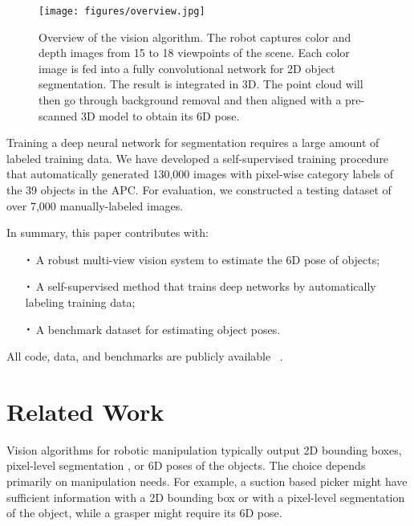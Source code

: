 \documentclass[letterpaper, 10 pt, conference]{ieeeconf}  %
\newcommand*{\Cdot}{\raisebox{-0.25ex}{\scalebox{1.75}{$\cdot$}}}
\begin{document}
\begin{figure*}[t]
\vspace{2mm}
\centering
  \texttt{[image: figures/overview.jpg]}
  \caption{Overview of the vision algorithm. The robot captures color and depth images from 15 to 18 viewpoints of the scene. Each color image is fed into a fully convolutional network \cite{long2015fully} for 2D object segmentation. The result is integrated in 3D. The point cloud will then go through background removal and then aligned with a pre-scanned 3D model to obtain its 6D pose.}
  \label{fig:overview}
\end{figure*}

Training a deep neural network for segmentation requires a large amount of labeled training data. We have developed a self-supervised training procedure that automatically generated 130,000 images with pixel-wise category labels of the 39 objects in the APC. For evaluation, we constructed a testing dataset of over 7,000 manually-labeled images. 

In summary, this paper contributes with:
\begin{itemize}
\item[$\Cdot$] A robust multi-view vision system to estimate the 6D pose of objects;
\item[$\Cdot$] A self-supervised method that trains deep networks by automatically labeling training data; 
\item[$\Cdot$] A benchmark dataset for estimating object poses. \end{itemize}
All code, data, and benchmarks are publicly available~ \cite{projectwebsite}.



\section{Related Work}
\label{sec:RelatedWork}
Vision algorithms for robotic manipulation typically output 2D bounding boxes, pixel-level segmentation \cite{jonschkowski2016probabilistic, rbolessons}, or 6D poses \cite{zhang2016dorapicker, yuapc2015} of the objects.
The choice depends primarily on manipulation needs. For example, a suction based picker might have sufficient information with a 2D bounding box or with a pixel-level segmentation of the object, while a grasper might require its 6D pose. %
\end{document}
